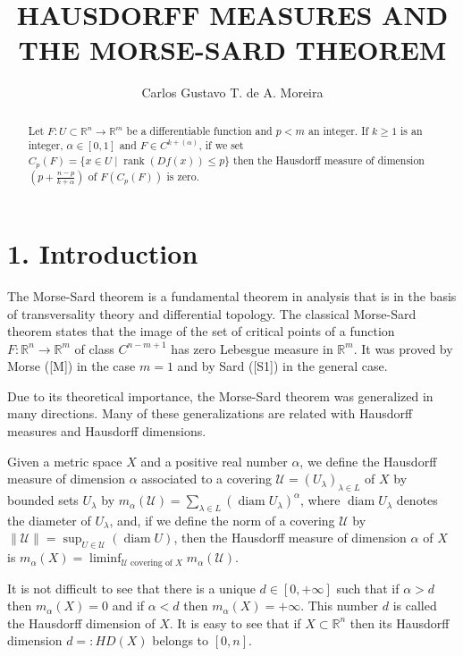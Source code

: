 \documentclass[10pt]{article}
\title{HAUSDORFF MEASURES AND THE MORSE-SARD THEOREM }
\author{Carlos Gustavo T. de A. Moreira}
\date{}
\begin{document}
\maketitle


\begin{abstract}
Let $F: U \subset \mathbb{R}^{n} \rightarrow \mathbb{R}^{m}$ be a differentiable function and $p<m$ an integer. If $k \geq 1$ is an integer, $\alpha \in[0,1]$ and $F \in C^{k+(\alpha)}$, if we set $C_{p}(F)=\{x \in U \mid \operatorname{rank}(D f(x)) \leq p\}$ then the Hausdorff measure of dimension $\left(p+\frac{n-p}{k+\alpha}\right)$ of $F\left(C_{p}(F)\right)$ is zero.
\end{abstract}

\section*{1. Introduction}
The Morse-Sard theorem is a fundamental theorem in analysis that is in the basis of transversality theory and differential topology. The classical Morse-Sard theorem states that the image of the set of critical points of a function $F: \mathbb{R}^{n} \rightarrow \mathbb{R}^{m}$ of class $C^{n-m+1}$ has zero Lebesgue measure in $\mathbb{R}^{m}$. It was proved by Morse ([M]) in the case $m=1$ and by Sard ([S1]) in the general case.

Due to its theoretical importance, the Morse-Sard theorem was generalized in many directions. Many of these generalizations are related with Hausdorff measures and Hausdorff dimensions.

Given a metric space $X$ and a positive real number $\alpha$, we define the Hausdorff measure of dimension $\alpha$ associated to a covering $\mathcal{U}=\left(U_{\lambda}\right)_{\lambda \in L}$ of $X$ by bounded sets $U_{\lambda}$ by $m_{\alpha}(\mathcal{U})=\sum_{\lambda \in L}\left(\operatorname{diam} U_{\lambda}\right)^{\alpha}$, where $\operatorname{diam} U_{\lambda}$ denotes the diameter of $U_{\lambda}$, and, if we define the norm of a covering $\mathcal{U}$ by $\|\mathcal{U}\|=\sup _{U \in \mathcal{U}}(\operatorname{diam} U)$, then the Hausdorff measure of dimension $\alpha$ of $X$ is $m_{\alpha}(X)=\liminf _{\mathcal{U} \text { covering of } X} m_{\alpha}(\mathcal{U})$.

It is not difficult to see that there is a unique $d \in[0,+\infty]$ such that if $\alpha>d$ then $m_{\alpha}(X)=0$ and if $\alpha<d$ then $m_{\alpha}(X)=+\infty$. This number $d$ is called the Hausdorff dimension of $X$. It is easy to see that if $X \subset \mathbb{R}^{n}$ then its Hausdorff dimension $d=: H D(X)$ belongs to $[0, n]$.
\end{document}
